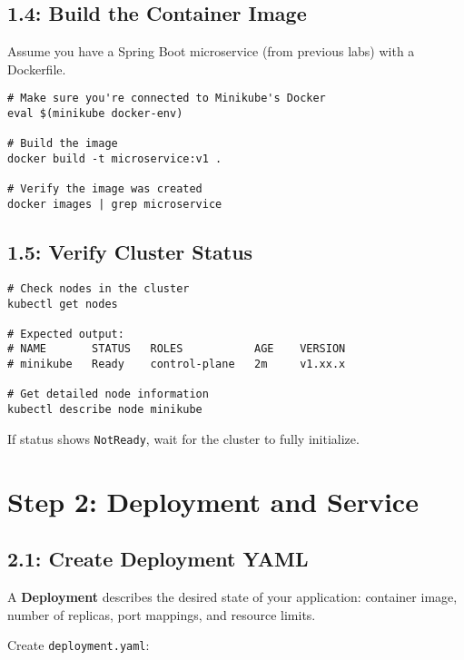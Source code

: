 \documentclass[12pt,a4paper]{article}
\begin{document}
\subsection{1.4: Build the Container Image}

Assume you have a Spring Boot microservice (from previous labs) with a Dockerfile.

\begin{lstlisting}[caption=Build Docker image]
# Make sure you're connected to Minikube's Docker
eval $(minikube docker-env)

# Build the image
docker build -t microservice:v1 .

# Verify the image was created
docker images | grep microservice
\end{lstlisting}

\subsection{1.5: Verify Cluster Status}

\begin{lstlisting}[caption=Verify cluster status]
# Check nodes in the cluster
kubectl get nodes

# Expected output:
# NAME       STATUS   ROLES           AGE    VERSION
# minikube   Ready    control-plane   2m     v1.xx.x

# Get detailed node information
kubectl describe node minikube
\end{lstlisting}

\begin{tipbox}
If status shows \texttt{NotReady}, wait for the cluster to fully initialize.
\end{tipbox}

\newpage

\section{Step 2: Deployment and Service}

\subsection{2.1: Create Deployment YAML}

A \textbf{Deployment} describes the desired state of your application: container image, number of replicas, port mappings, and resource limits.

Create \texttt{deployment.yaml}:
\end{document}
